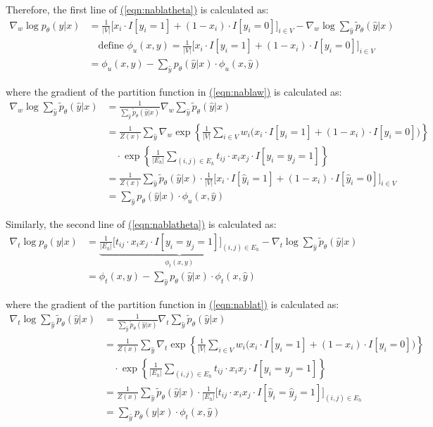 \documentclass[11pt,a4paper]{article}
\begin{document}
Therefore, the first line of \hyperref[eqn:nablatheta]{(\ref{eqn:nablatheta})} is calculated as:
\begin{align}
\nabla_w\log p_\theta(y|x)&=\frac{1}{|V|}\Big[x_i\cdot I[y_i=1]+(1-x_i)\cdot I[y_i=0]\Big]_{i\in V}-\nabla_w\log\sum_{\hat{y}}\tilde{p}_\theta(\hat{y}|x)\nonumber\\
&\quad\text{define }\phi_u(x,y)=\frac{1}{|V|}\Big[x_i\cdot I[y_i=1]+(1-x_i)\cdot I[y_i=0]\Big]_{i\in V}\nonumber\\
&=\phi_u(x,y)-\sum_{\hat{y}}p_\theta(\hat{y}|x)\cdot\phi_u(x,\hat{y})
\label{eqn:nablaw}
\end{align}

where the gradient of the partition function in \hyperref[eqn:nablaw]{(\ref{eqn:nablaw})} is calculated as:
\begin{align}
\nabla_w\log\sum_{\hat{y}}\tilde{p}_\theta(\hat{y}|x)&=\frac{1}{\sum_{\hat{y}}\tilde{p}_\theta(\hat{y}|x)}\nabla_w\sum_{\hat{y}}\tilde{p}_\theta(\hat{y}|x)\nonumber\\
&=\frac{1}{Z(x)}\sum_{\hat{y}}\nabla_w\exp\left\{\frac{1}{|V|}\sum_{i\in V}w_i\big(x_i\cdot I[y_i=1]+(1-x_i)\cdot I[y_i=0]\big)\right\}\nonumber\\
&\quad\cdot\exp\left\{\frac{1}{|E_h|}\sum_{(i,j)\in E_h}t_{ij}\cdot x_ix_j\cdot I[y_i=y_j=1]\right\}\nonumber\\
&=\frac{1}{Z(x)}\sum_{\hat{y}}\tilde{p}_\theta(\hat{y}|x)\cdot\frac{1}{|V|}\Big[x_i\cdot I[\hat{y}_i=1]+(1-x_i)\cdot I[\hat{y}_i=0]\Big]_{i\in V}\nonumber\\
&=\sum_{\hat{y}}p_\theta(\hat{y}|x)\cdot\phi_u(x,\hat{y})
\end{align}

Similarly, the second line of \hyperref[eqn:nablatheta]{(\ref{eqn:nablatheta})} is calculated as:
\begin{align}
\nabla_t\log p_\theta(y|x)&=\underbrace{\frac{1}{|E_h|}\Big[t_{ij}\cdot x_ix_j\cdot I[y_i=y_j=1]\Big]_{(i,j)\in E_h}}_{\phi_t(x,y)}-\nabla_t\log\sum_{\hat{y}}\tilde{p}_\theta(\hat{y}|x)\nonumber\\
&=\phi_t(x,y)-\sum_{\hat{y}}p_\theta(\hat{y}|x)\cdot\phi_t(x,\hat{y})
\label{eqn:nablat}
\end{align}

where the gradient of the partition function in \hyperref[eqn:nablat]{(\ref{eqn:nablat})} is calculated as:
\begin{align}
\nabla_t\log\sum_{\hat{y}}\tilde{p}_\theta(\hat{y}|x)&=\frac{1}{\sum_{\hat{y}}\tilde{p}_\theta(\hat{y}|x)}\nabla_t\sum_{\hat{y}}\tilde{p}_\theta(\hat{y}|x)\nonumber\\
&=\frac{1}{Z(x)}\sum_{\hat{y}}\nabla_t\exp\left\{\frac{1}{|V|}\sum_{i\in V}w_i\big(x_i\cdot I[y_i=1]+(1-x_i)\cdot I[y_i=0]\big)\right\}\nonumber\\
&\quad\cdot\exp\left\{\frac{1}{|E_h|}\sum_{(i,j)\in E_h}t_{ij}\cdot x_ix_j\cdot I[y_i=y_j=1]\right\}\nonumber\\
&=\frac{1}{Z(x)}\sum_{\hat{y}}\tilde{p}_\theta(\hat{y}|x)\cdot\frac{1}{|E_h|}\Big[t_{ij}\cdot x_ix_j\cdot I[\hat{y}_i=\hat{y}_j=1]\Big]_{(i,j)\in E_h}\nonumber\\
&=\sum_{\hat{y}}p_\theta(\hat{y}|x)\cdot\phi_t(x,\hat{y})
\end{align}
\end{document}

